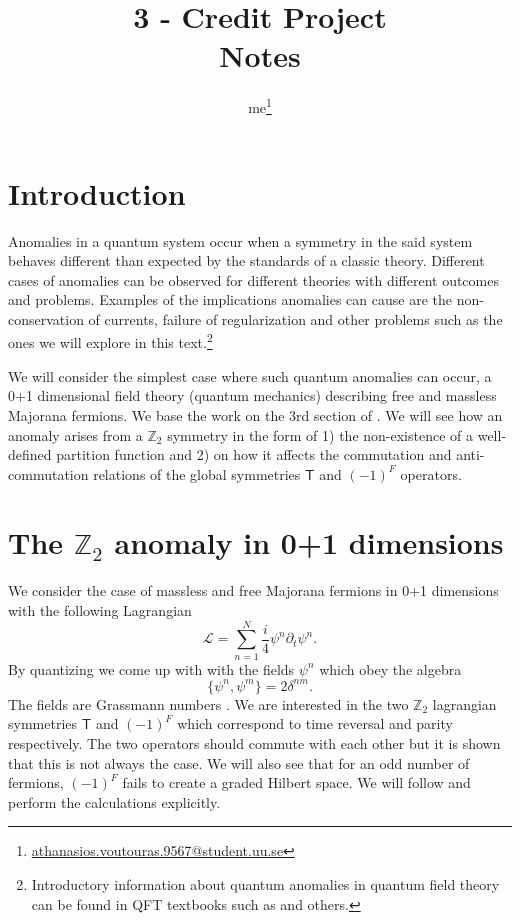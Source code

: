 \documentclass[12pt,a4paper]{article}
\title{3 - Credit Project \\ Notes}
\author{me\footnote{\href{mailto:athanasios.voutouras.9567@student.uu.se}{athanasios.voutouras.9567@student.uu.se}}
}
\begin{document}
\maketitle

\section{Introduction}
Anomalies in a quantum system occur when a symmetry in the said system behaves
different than expected by the standards of a classic theory. Different cases
of anomalies can be observed for different theories with different outcomes and
problems. Examples of the implications anomalies can cause are the non-conservation of currents, failure
of regularization and other problems such as the ones we will explore in this
text.\footnote{Introductory information about quantum anomalies in quantum field theory
can be found in QFT textbooks such as \cite{MichaelE.Peskin2019, Srednicki2019}
and others.}

We will consider the simplest case where such quantum anomalies can occur, a
0+1 dimensional field theory (quantum mechanics) describing free and massless
Majorana fermions. We base the work on the 3rd section of \cite{Delmastro2021}.
We will see how an anomaly arises from a $ \mathbb{Z}_2  $ symmetry in the
form of 1) the non-existence of a well-defined partition function and 2) on how it
affects the commutation and anti-commutation relations of the global symmetries
$ \mathsf{T} $ and $ (-1)^F$ operators.


\section{The $\mathbb{Z}_2$ anomaly in 0+1 dimensions}
We consider the case of massless and free Majorana
fermions in 0+1 dimensions with the following Lagrangian
\begin{equation}
	\mathcal{ L } = \sum_{n=1}^{N} \frac{ i }{ 4 } \psi ^n \partial _t \psi ^n.
\end{equation}
By quantizing we come up with with the fields $ \psi ^n $ which obey the algebra
\begin{equation}
	\{ \psi ^n, \psi^m\} = 2 \delta ^{ nm }. 
\end{equation}
The fields are Grassmann numbers \cite{Traubenberg2009, Berezin1975}. We are interested in the two $ \mathbb{Z}_2  $ lagrangian symmetries $ \mathsf{T}$ and $ (-1)^F $ which correspond to time reversal and parity respectively. The two operators should commute with each other but it is shown that this is not always the case. We will also see that for an odd number of fermions, $ (-1)^F $ fails to create a graded Hilbert space.
We will follow \cite{Delmastro2021} and perform the calculations explicitly.
\end{document}
